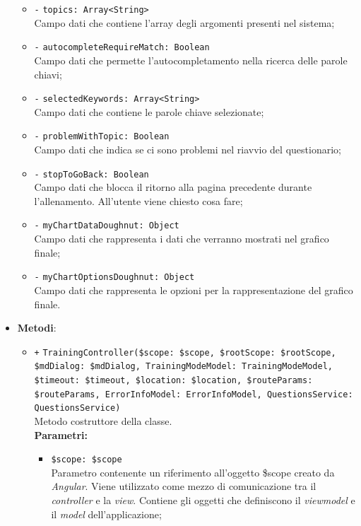 \begin{itemize}
\begin{itemize}
		\item \texttt{-} \texttt{topics: Array<String>} \\Campo dati che contiene l'array degli argomenti presenti nel sistema;
		\item \texttt{-} \texttt{autocompleteRequireMatch: Boolean} \\Campo dati che permette l'autocompletamento nella ricerca delle parole chiavi;
		\item \texttt{-} \texttt{selectedKeywords: Array<String>} \\Campo dati che contiene le parole chiave selezionate;
		\item \texttt{-} \texttt{problemWithTopic: Boolean} \\Campo dati che indica se ci sono problemi nel riavvio del questionario;
		\item \texttt{-} \texttt{stopToGoBack: Boolean} \\Campo dati che blocca il ritorno alla pagina precedente durante l'allenamento. All'utente viene chiesto cosa fare;
		\item \texttt{-} \texttt{myChartDataDoughnut: Object} \\ Campo dati che rappresenta i dati che verranno mostrati nel grafico finale;
		\item \texttt{-} \texttt{myChartOptionsDoughnut: Object} \\ Campo dati che rappresenta le opzioni per la rappresentazione del grafico finale.
	\end{itemize}
	\item \textbf{Metodi}:
	\begin{itemize}
		\item \texttt{+} \texttt{TrainingController(\$scope: \$scope, \$rootScope: \$rootScope, \$mdDialog: \$mdDialog, TrainingModeModel: TrainingModeModel, \$timeout: \$timeout, \$location: \$location, \$routeParams: \$routeParams, ErrorInfoModel: ErrorInfoModel, QuestionsService: QuestionsService)} \\ Metodo costruttore della classe. \\
		\textbf{Parametri:}
		\begin{itemize}
			\item \texttt{\$scope: \$scope} \\
			Parametro contenente un riferimento all'oggetto \$scope creato da \textit{Angular}. Viene utilizzato come mezzo di comunicazione tra il \textit{controller} e la \textit{view}. Contiene gli oggetti che definiscono il \textit{viewmodel} e il \textit{model} dell'applicazione;

\end{itemize}
\end{itemize}
\end{itemize}
